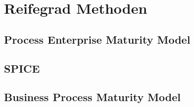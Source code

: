 \newpage
\section{Reifegrad Methoden}

\subsection{Process Enterprise Maturity Model}


\subsection{SPICE}


\subsection{Business Process Maturity Model}




